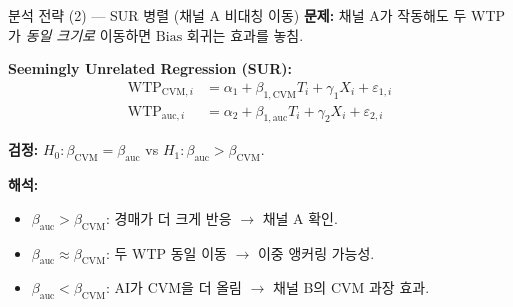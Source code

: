 \documentclass[aspectratio=169]{beamer}
\begin{document}
\begin{frame}{분석 전략 (2) --- SUR 병렬 (채널 A 비대칭 이동)}
  \textbf{문제:} 채널 A가 작동해도 두 WTP가 \emph{동일 크기로} 이동하면 $\mathrm{Bias}$ 회귀는 효과를 놓침.

  \vspace{0.5em}
  \textbf{Seemingly Unrelated Regression (SUR):}
  \begin{align*}
    \mathrm{WTP}_{\text{CVM},i} &= \alpha_1 + \beta_{1,\text{CVM}} T_i + \gamma_1 X_i + \varepsilon_{1,i} \\
    \mathrm{WTP}_{\text{auc},i} &= \alpha_2 + \beta_{1,\text{auc}} T_i + \gamma_2 X_i + \varepsilon_{2,i}
  \end{align*}

  \textbf{검정:} $H_0\colon \beta_{\text{CVM}} = \beta_{\text{auc}}$ vs $H_1\colon \beta_{\text{auc}} > \beta_{\text{CVM}}$.

  \vspace{0.5em}
  \textbf{해석:}
  \begin{itemize}\itemsep0.1em
    \item $\beta_{\text{auc}} > \beta_{\text{CVM}}$: 경매가 더 크게 반응 $\rightarrow$ 채널 A 확인.
    \item $\beta_{\text{auc}} \approx \beta_{\text{CVM}}$: 두 WTP 동일 이동 $\rightarrow$ 이중 앵커링 가능성.
    \item $\beta_{\text{auc}} < \beta_{\text{CVM}}$: AI가 CVM을 더 올림 $\rightarrow$ 채널 B의 CVM 과장 효과.
  \end{itemize}

\end{frame}
\end{document}
